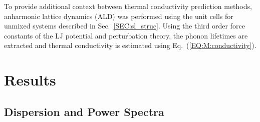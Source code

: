 To provide additional context between thermal conductivity prediction methods, anharmonic lattice dynamics (ALD) was performed using the unit cells for unmixed systems described in Sec.~\ref{SEC:sl_struc}. Using the third order force constants of the LJ potential and perturbation theory, the phonon lifetimes are extracted and thermal conductivity is estimated using Eq.~(\ref{EQ:M:conductivity}).

\section{Results}\label{SEC:results}
\subsection{Dispersion and Power Spectra}

